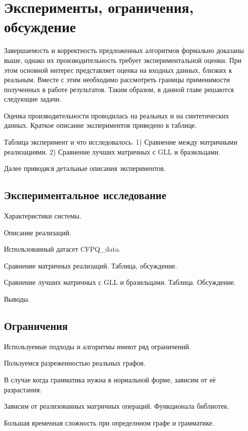 \chapter{Эксперименты, ограничения, обсуждение}\label{ch:ch5}
Завершаемость и корректность предложенных алгоритмов формально доказаны выше, однако их производительность требует экспериментальной оценки. При этом основной интерес представляет оценка на входных данных, близких к реальным. Вместе с этим необходимо рассмотреть границы применимости полученных в работе результатов. Таким образом, в данной главе решаются следующие задачи.

Оценка производительности проводилась на реальных и на синтетических данных. Краткое описание экспериментов приведено в таблице.

Таблица эксперимент и что исследовалось.
1) Сравнение между матричными реализациями. 2) Сравнение лучших матричных с GLL и бразильцами.

Далее приводяся детальные описания экспериментов.

\section{Экспериментальное исследование}\label{sec:ch5/sect1}
Характеристики системы.

Описание реализаций.

Использованный датасет CFPQ\_data.

Сравнение матричных реализаций. Таблица, обсуждение.

Сравнение лучших матричных с GLL и бразильцами. Таблица. Обсуждение.
 
Выводы. 

\section{Ограничения}\label{sec:ch5/sect3}
Используемые подходы и алгоритмы имеют ряд ограничений.

Пользуемся разреженностью реальных графов.

В случае когда грамматика нужна в нормальной форме, зависим от её разрастания.

Зависим от реализованных матричных операций. Функционала библиотек.

Большая временная сложность при определнном графе и грамматике.

\clearpage